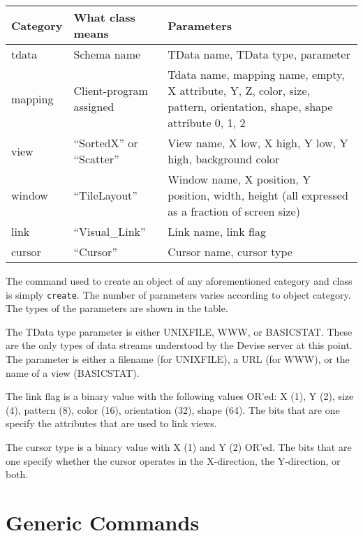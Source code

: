 \noindent
\begin{tabular}{l|l|p{4in}}
Category & What class means           & Parameters\\
\hline
tdata    & Schema name                & TData name, TData type, parameter \\
mapping  & Client-program assigned    & Tdata name, mapping name, empty,
                                        X attribute, Y, Z, color, size,
                                        pattern, orientation, shape,
                                        shape attribute 0, 1, 2 \\
view     & ``SortedX'' or ``Scatter'' & View name, X low, X high, Y low,
                                        Y high, background color \\
window   & ``TileLayout''             & Window name, X position, Y position,
                                        width, height (all expressed as a
                                        fraction of screen size) \\
link     & ``Visual\_Link''           & Link name, link flag \\
cursor   & ``Cursor''                 & Cursor name, cursor type \\
\hline
\end{tabular}

\bigskip

The command used to create an object of any aforementioned category
and class is simply {\tt create}. The number of parameters varies
according to object category. The types of the parameters are shown in
the table.

The TData type parameter is either UNIXFILE, WWW, or BASICSTAT. These
are the only types of data streams understood by the Devise server at
this point.  The parameter is either a filename (for UNIXFILE), a URL
(for WWW), or the name of a view (BASICSTAT).

The link flag is a binary value with the following values OR'ed: X
(1), Y (2), size (4), pattern (8), color (16), orientation (32), shape
(64). The bits that are one specify the attributes that are used to
link views.

The cursor type is a binary value with X (1) and Y (2) OR'ed. The bits
that are one specify whether the cursor operates in the X-direction,
the Y-direction, or both.

\section{Generic Commands}

